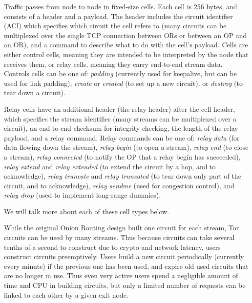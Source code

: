 \documentclass[times,10pt,twocolumn]{article}
\begin{document}
\label{subsec:cells}

Traffic passes from node to node in fixed-size cells. Each cell is 256
bytes, and consists of a header and a payload. The header includes the
circuit identifier (ACI) which specifies which circuit the cell refers to
(many circuits can be multiplexed over the single TCP connection between
ORs or between an OP and an OR), and a command to describe what to do
with the cell's payload. Cells are either control cells, meaning they are
intended to be interpreted by the node that receives them, or relay cells,
meaning they carry end-to-end stream data. Controls cells can be one of:
\emph{padding} (currently used for keepalive, but can be used for link
padding), \emph{create} or \emph{created} (to set up a new circuit),
or \emph{destroy} (to tear down a circuit).

Relay cells have an additional header (the relay header) after the
cell header, which specifies the stream identifier (many streams can
be multiplexed over a circuit), an end-to-end checksum for integrity
checking, the length of the relay payload, and a relay command. Relay
commands can be one of: \emph{relay
data} (for data flowing down the stream), \emph{relay begin} (to open a
stream), \emph{relay end} (to close a stream), \emph{relay connected}
(to notify the OP that a relay begin has succeeded), \emph{relay
extend} and \emph{relay extended} (to extend the circuit by a hop,
and to acknowledge), \emph{relay truncate} and \emph{relay truncated}
(to tear down only part of the circuit, and to acknowledge), \emph{relay
sendme} (used for congestion control), and \emph{relay drop} (used to
implement long-range dummies).

We will talk more about each of these cell types below.


\label{subsec:circuits}

While the original Onion Routing design built one circuit for each stream,
Tor circuits can be used by many streams. Thus because circuits can
take several tenths of a second to construct due to crypto and network
latency, users construct circuits preemptively. Users build a new circuit
periodically (currently every minute) if the previous one has been used,
and expire old used circuits that are no longer in use. Thus even very
active users spend a negligible amount of time and CPU in building
circuits, but only a limited number of requests can be linked to each
other by a given exit node.
\end{document}
